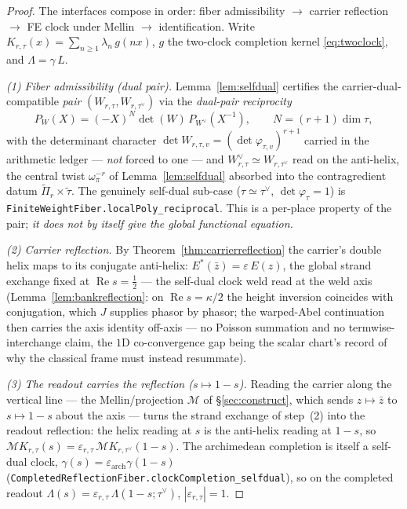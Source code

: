 \documentclass[11pt]{article}
\theoremstyle{definition}
\renewcommand{\Re}{\operatorname{Re}}
\begin{document}
\begin{proof}
The interfaces compose in order: fiber admissibility $\to$ carrier reflection $\to$ FE clock under Mellin
$\to$ identification. Write $K_{r,\tau}(x)=\sum_{n\ge1}\lambda_n\,g(nx)$, $g$ the two-clock completion
kernel \eqref{eq:twoclock}, and $\Lambda=\gamma\,L$.

\emph{(1) Fiber admissibility (dual pair).} Lemma~\ref{lem:selfdual} certifies the carrier-dual-compatible
\emph{pair} $(W_{r,\tau},W_{r,\tau^\vee})$ via the \emph{dual-pair reciprocity}
\[
  P_{W}(X)=(-X)^{N}\det(W)\,P_{W^\vee}(X^{-1}),\qquad N=(r+1)\dim\tau,
\]
with the determinant character $\det W_{r,\tau,v}=(\det\varphi_{\tau,v})^{r+1}$ carried in the arithmetic
ledger --- \emph{not} forced to one --- and $W_{r,\tau}^\vee\simeq W_{r,\tau^\vee}$ read on the anti-helix, the central twist $\omega_\pi^{-r}$ of Lemma~\ref{lem:selfdual} absorbed into the contragredient datum $\widetilde\Pi_r\times\widetilde\tau$.
The genuinely self-dual sub-case ($\tau\simeq\tau^\vee$, $\det\varphi_\tau=1$) is
\texttt{FiniteWeightFiber.localPoly\_reciprocal}. This is a per-place property of the pair; \emph{it does not by
itself give the global functional equation.}

\emph{(2) Carrier reflection.} By Theorem~\ref{thm:carrierreflection} the carrier's double helix maps to its
conjugate anti-helix: $E^{*}(\bar z)=\varepsilon\,E(z)$, the global strand exchange fixed at $\Re s=\tfrac12$
--- the self-dual clock weld read at the weld axis (Lemma~\ref{lem:bankreflection}: on $\Re s=\kappa/2$ the height inversion coincides with conjugation, which $J$ supplies phasor by phasor; the warped-Abel continuation then carries the axis identity off-axis --- no Poisson summation and no termwise-interchange claim, the $1$D co-convergence gap being the scalar chart's record of why the classical frame must instead resummate).

\emph{(3) The readout carries the reflection ($s\mapsto1-s$).} Reading the carrier along the vertical line
--- the Mellin/projection $\mathcal M$ of \S\ref{sec:construct}, which sends $z\mapsto\bar z$ to $s\mapsto1-s$
about the axis --- turns the strand exchange of step~(2) into the readout reflection: the helix reading at $s$
is the anti-helix reading at $1-s$, so $\mathcal M K_{r,\tau}(s)=\varepsilon_{r,\tau}\,\mathcal M
K_{r,\tau^\vee}(1-s)$. The archimedean completion is itself a self-dual clock,
$\gamma(s)=\varepsilon_{\mathrm{arch}}\gamma(1-s)$
(\texttt{CompletedReflectionFiber.clockCompletion\_selfdual}), so on the completed readout
$\Lambda(s)=\varepsilon_{r,\tau}\,\Lambda(1-s;\tau^\vee)$, $|\varepsilon_{r,\tau}|=1$.


\end{proof}
\end{document}
